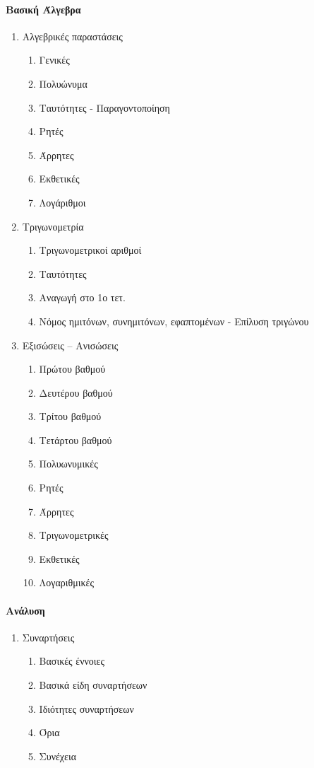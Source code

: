\documentclass[twoside,nofonts,internet,shmeiwseis]{thewria}
\begin{document}
\paragraph{Βασική Άλγεβρα}
\begin{enumerate}[resume]
\item Αλγεβρικές παραστάσεις
\begin{enumerate}
\item Γενικές
\item Πολυώνυμα
\item Ταυτότητες - Παραγοντοποίηση
\item Ρητές
\item Άρρητες
\item Εκθετικές
\item Λογάριθμοι
\end{enumerate}
\item Τριγωνομετρία
\begin{enumerate}
\item Τριγωνομετρικοί αριθμοί
\item Ταυτότητες
\item Αναγωγή στο 1ο τετ.
\item Νόμος ημιτόνων, συνημιτόνων, εφαπτομένων - Επίλυση τριγώνου
\end{enumerate}
\item Εξισώσεις – Ανισώσεις
\begin{enumerate}
\item Πρώτου βαθμού
\item Δευτέρου βαθμού
\item Τρίτου βαθμού
\item Τετάρτου βαθμού
\item Πολυωνυμικές
\item Ρητές
\item Άρρητες
\item Τριγωνομετρικές
\item Εκθετικές
\item Λογαριθμικές
\end{enumerate}
\end{enumerate}
\paragraph{Ανάλυση}
\begin{enumerate}[resume]
\item Συναρτήσεις
\begin{enumerate}
\item Βασικές έννοιες
\item Βασικά είδη συναρτήσεων
\item Ιδιότητες συναρτήσεων
\item Όρια
\item Συνέχεια
\end{enumerate}
\end{enumerate}
\end{document}
